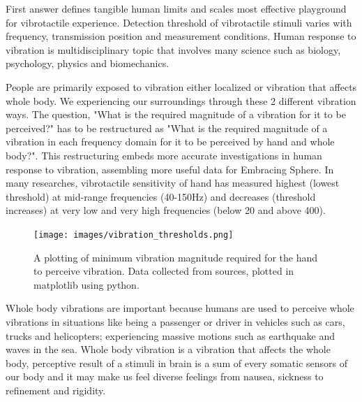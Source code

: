             First answer defines tangible human limits and scales most effective playground for vibrotactile experience. Detection threshold of vibrotactile stimuli varies with frequency, transmission position and measurement conditions. Human response to vibration is multidisciplinary topic that involves many science such as biology, psychology, physics and biomechanics\cite{Human_Response_to_Vibration}.\par

            People are primarily exposed to vibration either localized or vibration that affects whole body\cite{Human_Response_to_Vibration}. We experiencing our surroundings through these 2 different vibration ways. The question, "What is the required magnitude of a vibration for it to be perceived?" has to be restructured as "What is the required magnitude of a vibration in each frequency domain for it to be perceived by hand and whole body?". This restructuring embeds more accurate investigations in human response to vibration, assembling more useful data for Embracing Sphere. In many researches\cite{Human_Response_to_Vibration}\cite{Consonance_of_Vibrotactile_Chords}\cite{Threshold_of_Stimulation_Levels}\cite{Whole-Body_Vibration_Perception_Thresholds}, vibrotactile sensitivity of hand has measured highest (lowest threshold) at mid-range frequencies (40-150Hz) and decreases (threshold increases) at very low and very high frequencies (below 20 and above 400).\par

            \begin{figure}[H]
                \centering
                \texttt{[image: images/vibration\_thresholds.png]}
                \caption{A plotting of minimum vibration magnitude required for the hand to perceive vibration. Data collected from sources\cite{Haptic_Music}\cite{Haptic_Perception-A_Tutorial}\cite{Human_Response_to_Vibration}, plotted in matplotlib using python.}
                \label{fig:VIB_THRESHOLD}
            \end{figure}

            Whole body vibrations are important because humans are used to perceive whole vibrations in situations like being a passenger or driver in vehicles such as cars, trucks and helicopters; experiencing massive motions such as earthquake and waves in the sea\cite{Altinsoy_phd}. Whole body vibration is a vibration that affects the whole body, perceptive result of a stimuli in brain is a sum of every somatic sensors of our body\cite{Whole-Body_Vibration_Perception_Thresholds} and it may make us feel diverse feelings from nausea, sickness to refinement and rigidity\cite{Haptic_Perception-A_Tutorial}.\par 

